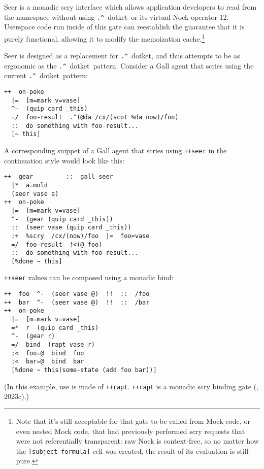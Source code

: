 \documentclass[twoside]{article}
\newcommand{\dotket}{\lstinline[style=inlinecode]{.^}~dotket}
\begin{document}
Seer is a monadic scry interface which allows application developers to read from the namespace without using \dotket~or its virtual Nock operator 12.  Userspace code run inside of this gate can reestablish the guarantee that it is purely functional, allowing it to modify the memoization cache.\footnote{Note that it's still acceptable for that gate to be called from Mock code, or even nested Mock code, that had previously performed scry requests that were not referentially transparent:  raw Nock is context-free, so no matter how the \lstinline[style=inlinecode]{[subject formula]} cell was created, the result of its evaluation is still pure.}

Seer is designed as a replacement for \dotket, and thus attempts to be as ergonomic as the \dotket~pattern.  Consider a Gall agent that scries using the current \dotket~pattern:

\begin{lstlisting}[style=listingcode]
++  on-poke
  |=  [m=mark v=vase]
  ^-  (quip card _this)
  =/  foo-result  .^(@da /cx/(scot %da now)/foo)
  ::  do something with foo-result...
  [~ this]
\end{lstlisting}

A corresponding snippet of a Gall agent that scries using \lstinline[style=inlinecode]{++seer} in the continuation style would look like this:

\begin{lstlisting}[style=listingcode]
++  gear         ::  gall seer
  |*  a=mold
  (seer vase a)
++  on-poke
  |=  [m=mark v=vase]
  ^-  (gear (quip card _this))
  ::  (seer vase (quip card _this))
  :+  %scry  /cx/(now)/foo  |=  foo=vase
  =/  foo-result  !<(@ foo)
  ::  do something with foo-result...
  [%done ~ this]
\end{lstlisting}

\lstinline[style=inlinecode]{++seer} values can be composed using a monadic bind:

\begin{lstlisting}[style=listingcode]
++  foo  ^-  (seer vase @)  !!  ::  /foo
++  bar  ^-  (seer vase @)  !!  ::  /bar
++  on-poke
  |=  [m=mark v=vase]
  =*  r  (quip card _this)
  ^-  (gear r)
  =/  bind  (rapt vase r)
  ;<  foo=@  bind  foo
  ;<  bar=@  bind  bar
  [%done ~ this(some-state (add foo bar))]
\end{lstlisting}

\noindent
(In this example, use is made of \lstinline[style=inlinecode]{++rapt}.  \lstinline[style=inlinecode]{++rapt} is a monadic scry binding gate (, 2023c).)
\end{document}
